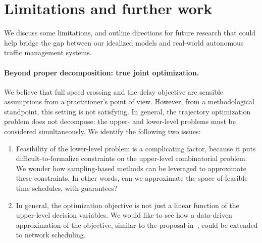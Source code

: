 \documentclass{report}
\theoremstyle{definition}
\theoremstyle{plain}
\begin{document}
\section{Limitations and further work}

We discuss some limitations, and outline directions for future research that
could help bridge the gap between our idealized models and real-world autonomous
traffic management systems.




\paragraph{Beyond proper decomposition: true joint optimization.}

We believe that full speed crossing and the delay objective are sensible
assumptions from a practitioner's point of view.
%
However, from a methodological standpoint, this setting is not satisfying.
%
In general, the trajectory optimization problem does not decompose: the upper-
and lower-level problems must be considered simultaneously.
%
We identify the following two issues:

\begin{enumerate}
  \item Feasibility of the lower-level problem is a complicating factor, because
        it puts difficult-to-formalize constraints on the upper-level
        combinatorial problem.
        We wonder how sampling-based methods can be leveraged to approximate
        these constraints.
        In other words, can we approximate the space of feasible time schedules,
        with guarantees?

  \item In general, the optimization objective is not just a linear function of
        the upper-level decision variables.
        We would like to see how a data-driven approximation of the objective,
        similar to the proposal
        in~\cite{hultApproximateSolutionOptimal2015,hultTechnicalReportApproximate},
        could be extended to network scheduling.
\end{enumerate}
\end{document}
